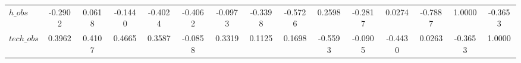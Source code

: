 \begin{center}
\begin{longtable}{lcccccccccccccc}
$h\_obs         $	 & 	          -0.2902	 & 	           0.0618	 & 	          -0.1440	 & 	          -0.4024	 & 	          -0.4062	 & 	          -0.0973	 & 	          -0.3398	 & 	          -0.5726	 & 	           0.2598	 & 	          -0.2817	 & 	           0.0274	 & 	          -0.7887	 & 	           1.0000	 & 	          -0.3653 \\ 
$tech\_obs      $	 & 	           0.3962	 & 	           0.4107	 & 	           0.4665	 & 	           0.3587	 & 	          -0.0858	 & 	           0.3319	 & 	           0.1125	 & 	           0.1698	 & 	          -0.5593	 & 	          -0.0905	 & 	          -0.4430	 & 	           0.0263	 & 	          -0.3653	 & 	           1.0000 \\ 
\end{longtable}
 \end{center}
